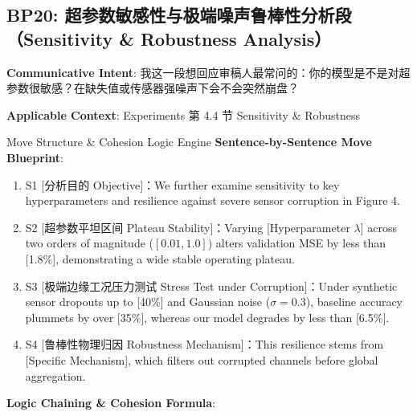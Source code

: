 \subsection{BP20: 超参数敏感性与极端噪声鲁棒性分析段（Sensitivity \& Robustness Analysis）}\label{sec:bp:BP20}
\noindent\textbf{\color{AcadNavy}Communicative Intent}: 我这一段想回应审稿人最常问的：你的模型是不是对超参数很敏感？在缺失值或传感器强噪声下会不会突然崩盘？\par\vspace{2pt}
\noindent\textbf{\color{AcadSlate}Applicable Context}: Experiments 第 4.4 节 Sensitivity \& Robustness\par\vspace{4pt}
\begin{ConceptBox}{Move Structure \& Cohesion Logic Engine}
\textbf{Sentence-by-Sentence Move Blueprint}:
\begin{enumerate}[label=\textbf{\color{AcadNavy}S\arabic*.}, leftmargin=2em, itemsep=2pt]
  \item S1 [分析目的 Objective]：We further examine sensitivity to key hyperparameters and resilience against severe sensor corruption in Figure 4.
  \item S2 [超参数平坦区间 Plateau Stability]：Varying [Hyperparameter $\lambda$] across two orders of magnitude ($[0.01, 1.0]$) alters validation MSE by less than [1.8\%], demonstrating a wide stable operating plateau.
  \item S3 [极端边缘工况压力测试 Stress Test under Corruption]：Under synthetic sensor dropouts up to [40\%] and Gaussian noise ($\sigma=0.3$), baseline accuracy plummets by over [35\%], whereas our model degrades by less than [6.5\%].
  \item S4 [鲁棒性物理归因 Robustness Mechanism]：This resilience stems from [Specific Mechanism], which filters out corrupted channels before global aggregation.
\end{enumerate}\par\vspace{4pt}
\textbf{Logic Chaining \& Cohesion Formula}:\par{}
\end{ConceptBox}

